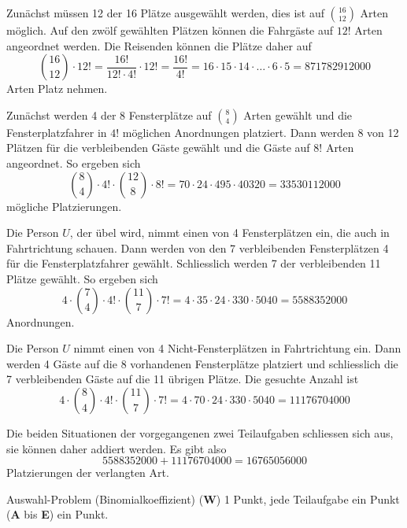 \begin{loesung}
\begin{teilaufgaben}
\item
Zunächst müssen 12 der 16 Plätze ausgewählt werden, dies ist auf
$\binom{16}{12}$ Arten möglich.
Auf den zwölf gewählten Plätzen können die Fahrgäste auf $12!$
Arten angeordnet werden.
Die Reisenden können die Plätze daher auf
\[
\binom{16}{12}\cdot 12!
=
\frac{16!}{12!\cdot 4!}\cdot 12!
=
\frac{16!}{4!}
=
16\cdot 15\cdot 14\cdot\ldots\cdot 6\cdot 5
=
871782912000
\]
Arten Platz nehmen.
\item
Zunächst werden 4 der 8 Fensterplätze auf $\binom{8}{4}$ Arten gewählt
und die Fensterplatzfahrer in $4!$ möglichen Anordnungen platziert.
Dann werden 8 von 12 Plätzen für die verbleibenden Gäste gewählt und
die Gäste auf $8!$ Arten angeordnet.
So ergeben sich
\[
\binom{8}{4}\cdot 4! \cdot \binom{12}{8}\cdot 8!
=
70 \cdot 24 \cdot 495 \cdot 40320
=
33530112000
\]
mögliche Platzierungen.
\item
Die Person $U$, der übel wird, nimmt einen von 4 Fensterplätzen ein,
die auch in Fahrtrichtung schauen.
Dann werden von den 7 verbleibenden Fensterplätzen 4 für die 
Fensterplatzfahrer gewählt.
Schliesslich werden 7 der verbleibenden 11 Plätze gewählt.
So ergeben sich
\[
4\cdot\binom{7}{4}\cdot 4! \cdot\binom{11}{7}\cdot 7!
=
4\cdot 35 \cdot 24\cdot 330\cdot 5040
=
5588352000
\]
Anordnungen.
\item
Die Person $U$ nimmt einen von 4 Nicht-Fensterplätzen in Fahrtrichtung
ein.
Dann werden 4 Gäste auf die 8 vorhandenen Fensterplätze platziert und
schliesslich die 7 verbleibenden Gäste auf die 11 übrigen Plätze.
Die gesuchte Anzahl ist
\[
4\cdot \binom{8}{4}\cdot 4!\cdot\binom{11}{7}\cdot 7!
=
4\cdot 70\cdot 24\cdot 330\cdot 5040
=
11176704000
\]
\item
Die beiden Situationen der vorgegangenen zwei Teilaufgaben schliessen sich
aus, sie können daher addiert werden.
Es gibt also
\[
5588352000
+
11176704000
=
16765056000
\]
Platzierungen der verlangten Art.
\qedhere
\end{teilaufgaben}
\end{loesung}

\begin{bewertung}
Auswahl-Problem (Binomialkoeffizient) ({\bf W}) 1 Punkt,
jede Teilaufgabe ein Punkt ({\bf A} bis {\bf E}) ein Punkt.
\end{bewertung}
